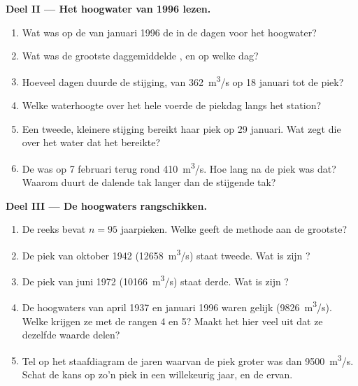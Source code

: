 \begin{problem}
\medskip
\noindent\textbf{Deel II --- Het hoogwater van 1996 lezen.}
\begin{enumerate}[resume]
  \item Wat was op de  van januari 1996 de  in de dagen
        voor het hoogwater?
  \item Wat was de grootste daggemiddelde , en op welke dag?
  \item Hoeveel dagen duurde de stijging, van \qty{362}{m^3/s} op
        18 januari tot de piek?
  \item Welke waterhoogte over het hele  voerde de piekdag langs het
        station?
  \item Een tweede, kleinere stijging bereikt haar piek op 29 januari. Wat zegt
        die over het water dat het  bereikte?
  \item De  was op 7 februari terug rond \qty{410}{m^3/s}. Hoe lang na de
        piek was dat? Waarom duurt de dalende tak langer dan de stijgende
        tak?
\end{enumerate}

\medskip
\noindent\textbf{Deel III --- De hoogwaters rangschikken.}
\begin{enumerate}[resume]
  \item De reeks bevat $n = 95$ jaarpieken. Welke  geeft de
        methode aan de grootste?
  \item De piek van oktober 1942 (\qty{12658}{m^3/s}) staat tweede. Wat is zijn
        ?
  \item De piek van juni 1972 (\qty{10166}{m^3/s}) staat derde. Wat is zijn
        ?
  \item De hoogwaters van april 1937 en januari 1996 waren gelijk
        (\qty{9826}{m^3/s}). Welke  krijgen ze met de rangen 4
        en 5? Maakt het hier veel uit dat ze dezelfde waarde delen?
  \item Tel op het staafdiagram de jaren waarvan de piek groter was dan
        \qty{9500}{m^3/s}. Schat de kans op zo'n piek in een willekeurig jaar,
        en de  ervan.
\end{enumerate}


\end{problem}
